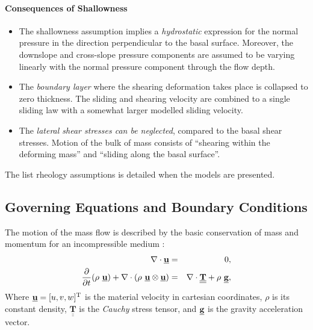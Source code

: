 \documentclass{article}
\def\dt{\partial t}
\begin{document}
\paragraph{Consequences of Shallowness}
\begin{itemize}
\item The shallowness assumption implies a \textit{hydrostatic} expression for the normal pressure in the direction perpendicular to the basal surface. Moreover, the downslope and cross-slope pressure components are assumed to be varying linearly with the normal pressure component through the flow depth.

\item The \textit{boundary layer} where the shearing deformation takes place is collapsed to zero thickness. The sliding and shearing velocity are combined to a single sliding law with a somewhat larger modelled sliding velocity.

\item The \textit{lateral shear stresses can be neglected}, compared to the basal shear stresses. Motion of the bulk of mass consists of ``shearing within the deforming mass'' and ``sliding along the basal surface''.
\end{itemize}

The list rheology assumptions is detailed when the models are presented.



\subsection{Governing Equations and Boundary Conditions}\label{subsec:GovEqsBCs}
The motion of the mass flow is described by the basic conservation of mass and momentum for an incompressible medium \citep{Patra2005}:
\begin{eqnarray}\label{eq:N_S}
\nabla \cdot\underline{{\textbf u}} &=& 0, \nonumber \\
\dfrac{\partial}{\dt}(\rho \ \underline{{\textbf u}})+\nabla \cdot (\rho \ \underline{{\textbf u}}\otimes \underline{{\textbf u}}) &=& \nabla \cdot \underline{\underline{{\mathbf{T}}}}+\rho \ \underline{{\textbf g}},
\end{eqnarray}
Where $\underline{{\textbf u}}=[u, v, w]^{\mathrm{T}}$ is the material velocity in cartesian coordinates, $\rho$ is its constant density, $\underline{\underline{{\mathbf{T}}}}$ is the \textit{Cauchy} stress tensor, and $\underline{{\textbf g}}$ is the gravity acceleration vector.
\end{document}
